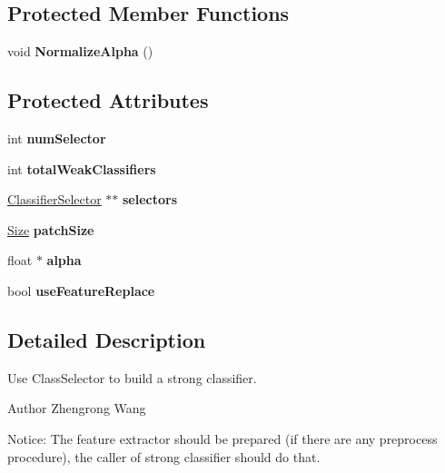 \subsection*{Protected Member Functions}
\begin{DoxyCompactItemize}
\item 
\hypertarget{classStrongClassifier_a475d324ff23806e652b8086fe637606a}{}void {\bfseries Normalize\+Alpha} ()\label{classStrongClassifier_a475d324ff23806e652b8086fe637606a}

\end{DoxyCompactItemize}
\subsection*{Protected Attributes}
\begin{DoxyCompactItemize}
\item 
\hypertarget{classStrongClassifier_ac28de5f3c7dd577833b322f5c2125545}{}int {\bfseries num\+Selector}\label{classStrongClassifier_ac28de5f3c7dd577833b322f5c2125545}

\item 
\hypertarget{classStrongClassifier_adb955a679fec4cc9dc30710381a27e11}{}int {\bfseries total\+Weak\+Classifiers}\label{classStrongClassifier_adb955a679fec4cc9dc30710381a27e11}

\item 
\hypertarget{classStrongClassifier_ad3bcc8911e2308b74f155c09883ac8f2}{}\hyperlink{classClassifierSelector}{Classifier\+Selector} $\ast$$\ast$ {\bfseries selectors}\label{classStrongClassifier_ad3bcc8911e2308b74f155c09883ac8f2}

\item 
\hypertarget{classStrongClassifier_a5f1728b5858ee6db12c796664218278a}{}\hyperlink{classSize}{Size} {\bfseries patch\+Size}\label{classStrongClassifier_a5f1728b5858ee6db12c796664218278a}

\item 
\hypertarget{classStrongClassifier_a57a7599a5b0e2c86e14441f313d0f934}{}float $\ast$ {\bfseries alpha}\label{classStrongClassifier_a57a7599a5b0e2c86e14441f313d0f934}

\item 
\hypertarget{classStrongClassifier_a1115a457d942f20ed7d63325192ff283}{}bool {\bfseries use\+Feature\+Replace}\label{classStrongClassifier_a1115a457d942f20ed7d63325192ff283}

\end{DoxyCompactItemize}


\subsection{Detailed Description}
Use Class\+Selector to build a strong classifier. \begin{DoxyAuthor}{Author}
Zhengrong Wang
\end{DoxyAuthor}
Notice\+: The feature extractor should be prepared (if there are any preprocess procedure), the caller of strong classifier should do that. 

